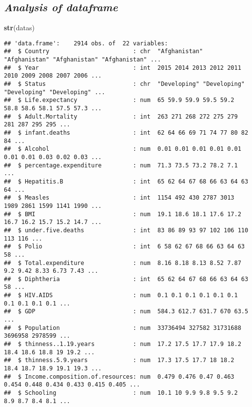 \documentclass[
]{article}
\newenvironment{Shaded}{\begin{snugshade}}{\end{snugshade}}
\newcommand{\FunctionTok}[1]{\textcolor[rgb]{0.13,0.29,0.53}{\textbf{#1}}}
\newcommand{\NormalTok}[1]{#1}
\begin{document}
\subsection{\texorpdfstring{\textbf{\emph{Analysis of
dataframe}}}{Analysis of dataframe}}\label{analysis-of-dataframe}

\begin{Shaded}
\begin{Highlighting}[]
\FunctionTok{str}\NormalTok{(datas)}
\end{Highlighting}
\end{Shaded}

\begin{verbatim}
## 'data.frame':    2914 obs. of  22 variables:
##  $ Country                        : chr  "Afghanistan" "Afghanistan" "Afghanistan" "Afghanistan" ...
##  $ Year                           : int  2015 2014 2013 2012 2011 2010 2009 2008 2007 2006 ...
##  $ Status                         : chr  "Developing" "Developing" "Developing" "Developing" ...
##  $ Life.expectancy                : num  65 59.9 59.9 59.5 59.2 58.8 58.6 58.1 57.5 57.3 ...
##  $ Adult.Mortality                : int  263 271 268 272 275 279 281 287 295 295 ...
##  $ infant.deaths                  : int  62 64 66 69 71 74 77 80 82 84 ...
##  $ Alcohol                        : num  0.01 0.01 0.01 0.01 0.01 0.01 0.01 0.03 0.02 0.03 ...
##  $ percentage.expenditure         : num  71.3 73.5 73.2 78.2 7.1 ...
##  $ Hepatitis.B                    : int  65 62 64 67 68 66 63 64 63 64 ...
##  $ Measles                        : int  1154 492 430 2787 3013 1989 2861 1599 1141 1990 ...
##  $ BMI                            : num  19.1 18.6 18.1 17.6 17.2 16.7 16.2 15.7 15.2 14.7 ...
##  $ under.five.deaths              : int  83 86 89 93 97 102 106 110 113 116 ...
##  $ Polio                          : int  6 58 62 67 68 66 63 64 63 58 ...
##  $ Total.expenditure              : num  8.16 8.18 8.13 8.52 7.87 9.2 9.42 8.33 6.73 7.43 ...
##  $ Diphtheria                     : int  65 62 64 67 68 66 63 64 63 58 ...
##  $ HIV.AIDS                       : num  0.1 0.1 0.1 0.1 0.1 0.1 0.1 0.1 0.1 0.1 ...
##  $ GDP                            : num  584.3 612.7 631.7 670 63.5 ...
##  $ Population                     : num  33736494 327582 31731688 3696958 2978599 ...
##  $ thinness..1.19.years           : num  17.2 17.5 17.7 17.9 18.2 18.4 18.6 18.8 19 19.2 ...
##  $ thinness.5.9.years             : num  17.3 17.5 17.7 18 18.2 18.4 18.7 18.9 19.1 19.3 ...
##  $ Income.composition.of.resources: num  0.479 0.476 0.47 0.463 0.454 0.448 0.434 0.433 0.415 0.405 ...
##  $ Schooling                      : num  10.1 10 9.9 9.8 9.5 9.2 8.9 8.7 8.4 8.1 ...
\end{verbatim}
\end{document}
